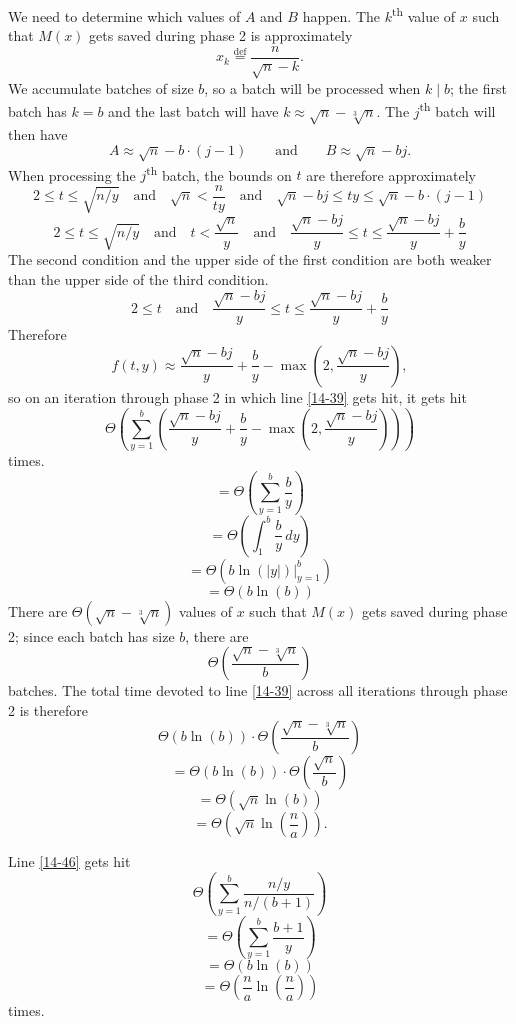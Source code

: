 \documentclass[12pt]{article}
\newcommand{\eqn}[1]{\begin{displaymath} #1 \end{displaymath}}
\newcommand{\neqn}[1]{\begin{equation} #1 \end{equation}}
\newcommand{\integral}[4]{\displaystyle\int_{#3}^{#4} \! #1 \, d#2}
\newcommand{\abs}[1]{\left\vert #1 \right\vert}
\newcommand{\eval}[3]{\left. #1 \right|_{#2}^{#3}}
\newcommand{\defeq}[0]{\overset{\mathrm{def}}{=}}
\newcommand{\quadtext}[1]{\quad \text{#1} \quad}
\newcommand{\qquadtext}[1]{\qquad \text{#1} \qquad}
\begin{document}
We need to determine which values of $A$ and $B$ happen.  The $k$\textsuperscript{th} value of $x$ such that $M(x)$ gets saved during phase 2 is approximately
\eqn{x_k \defeq \frac{n}{\sqrt{n} - k}.}
We accumulate batches of size $b$, so a batch will be processed when $k \mid b$; the first batch has $k=b$ and the last batch will have $k \approx \sqrt{n} - \sqrt[3]{n}$.  The $j$\textsuperscript{th} batch will then have
\eqn{A \approx \sqrt{n} - b \cdot (j-1) \qquadtext{and} B \approx \sqrt{n} - bj.}
When processing the $j$\textsuperscript{th} batch, the bounds on $t$ are therefore approximately
\eqn{2 \leq t \leq \sqrt{n/y} \quadtext{and} \sqrt{n} < \frac{n}{ty} \quadtext{and} \sqrt{n}-bj \leq ty \leq \sqrt{n}-b\cdot(j-1)}
\eqn{2 \leq t \leq \sqrt{n/y} \quadtext{and} t < \frac{\sqrt{n}}{y} \quadtext{and} \frac{\sqrt{n}-bj}{y} \leq t \leq \frac{\sqrt{n}-bj}{y}+\frac{b}{y}}
The second condition and the upper side of the first condition are both weaker than the upper side of the third condition.
\eqn{2 \leq t \quadtext{and} \frac{\sqrt{n}-bj}{y} \leq t \leq \frac{\sqrt{n}-bj}{y}+\frac{b}{y}}
Therefore
\eqn{f(t,y) \approx \frac{\sqrt{n}-bj}{y}+\frac{b}{y} - \max\left(2, \frac{\sqrt{n}-bj}{y}\right),}
so on an iteration through phase 2 in which line \ref{14-39} gets hit, it gets hit
\eqn{\Theta\left(\sum_{y=1}^b \left( \frac{\sqrt{n}-bj}{y}+\frac{b}{y} - \max\left(2, \frac{\sqrt{n}-bj}{y}\right)\right)\right)}
times.
\eqn{= \Theta\left( \sum_{y=1}^b \frac{b}{y} \right)}
\eqn{= \Theta\left( \integral{\frac{b}{y}}{y}{1}{b} \right)}
\eqn{= \Theta\left( \eval{b\ln(\abs{y})}{y=1}{b} \right)}
\eqn{= \Theta\left( b \ln(b) \right)}
There are $\Theta(\sqrt{n}-\sqrt[3]{n})$ values of $x$ such that $M(x)$ gets saved during phase 2; since each batch has size $b$, there are
\eqn{\Theta\left( \frac{\sqrt{n}-\sqrt[3]{n}}{b} \right)}
batches.  The total time devoted to line \ref{14-39} across all iterations through phase 2 is therefore
\eqn{\Theta\left( b \ln(b) \right) \cdot \Theta\left( \frac{\sqrt{n}-\sqrt[3]{n}}{b} \right)}
\eqn{= \Theta\left( b \ln(b) \right) \cdot \Theta\left( \frac{\sqrt{n}}{b} \right)}
\eqn{= \Theta\left( \sqrt{n} \ln(b) \right)}
\neqn{= \Theta\left( \sqrt{n} \ln\left(\frac{n}{a}\right) \right). \label{14-39-time}}

Line \ref{14-46} gets hit
\eqn{\Theta\left( \sum_{y=1}^b \frac{n/y}{n/(b+1)} \right)}
\eqn{= \Theta\left( \sum_{y=1}^b \frac{b+1}{y} \right)}
\eqn{= \Theta\left( b \ln(b) \right)}
\neqn{= \Theta\left( \frac{n}{a} \ln\left(\frac{n}{a}\right) \right) \label{14-46-time}}
times.
\end{document}
